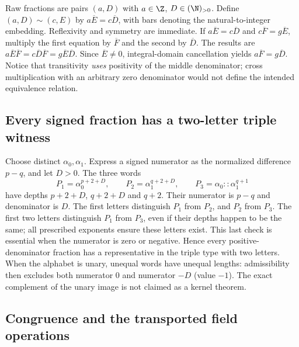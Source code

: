 Raw fractions are pairs $(a,D)$ with $a\in\Z$, $D\in(\N)_{>0}$. Define $(a,D)\sim(c,E)$ by $a\overline E=c\overline D$, with bars denoting the natural-to-integer embedding. Reflexivity and symmetry are immediate. If $a\overline E=c\overline D$ and $c\overline F=g\overline E$, multiply the first equation by $\overline F$ and the second by $\overline D$. The results are $a\overline E\overline F=c\overline D\overline F=g\overline E\overline D$. Since $\overline E\ne0$, integral-domain cancellation yields $a\overline F=g\overline D$. Notice that transitivity \emph{uses} positivity of the middle denominator; cross multiplication with an arbitrary zero denominator would not define the intended equivalence relation.

\subsection{Every signed fraction has a two-letter triple witness}\label{supp:6-3}
\par{}\par\smallskip

Choose distinct $\alpha_0,\alpha_1$. Express a signed numerator as the normalized difference $p-q$, and let $D>0$. The three words
\[
 P_1=\alpha_0^{p+2+D},\qquad
 P_2=\alpha_1^{q+2+D},\qquad
 P_3=\alpha_0::\alpha_1^{q+1}
\]
have depths $p+2+D$, $q+2+D$ and $q+2$. Their numerator is $p-q$ and denominator is $D$. The first letters distinguish $P_1$ from $P_2$, and $P_2$ from $P_3$. The first two letters distinguish $P_1$ from $P_3$, even if their depths happen to be the same; all prescribed exponents ensure these letters exist. This last check is essential when the numerator is zero or negative. Hence every positive-denominator fraction has a representative in the triple type with two letters. When the alphabet is unary, unequal words have unequal lengths: admissibility then excludes both numerator $0$ and numerator $-D$ (value $-1$). The exact complement of the unary image is not claimed as a kernel theorem.

\subsection{Congruence and the transported field operations}\label{supp:6-4}
\par{}\par\smallskip

